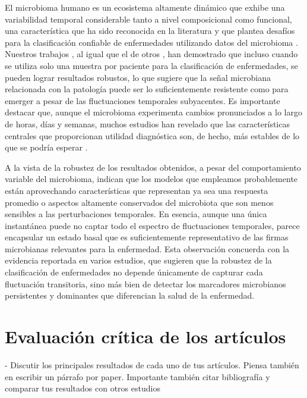 El microbioma humano es un ecosistema altamente dinámico que exhibe una variabilidad temporal considerable tanto a nivel composicional como funcional, una característica que ha sido reconocida en la literatura y que plantea desafíos para la clasificación confiable de enfermedades utilizando datos del microbioma \cite{aldars2021systematic}. Nuestros trabajos \cite{paper2, paper3}, al igual que el de otros \cite{eck2017robust}, han demostrado que incluso cuando se utiliza solo una muestra por paciente para la clasificación de enfermedades, se pueden lograr resultados robustos, lo que sugiere que la señal microbiana relacionada con la patología puede ser lo suficientemente resistente como para emerger a pesar de las fluctuaciones temporales subyacentes. Es importante destacar que, aunque el microbioma experimenta cambios pronunciados a lo largo de horas, días y semanas, muchos estudios han revelado que las características centrales que proporcionan utilidad diagnóstica son, de hecho, más estables de lo que se podría esperar \cite{mehta2018stability}.

A la vista de la robustez de los resultados obtenidos, a pesar del comportamiento variable del microbioma, indican que los modelos que empleamos probablemente están aprovechando características que representan ya sea una respuesta promedio o aspectos altamente conservados del microbiota que son menos sensibles a las perturbaciones temporales. En esencia, aunque una única instantánea puede no captar todo el espectro de fluctuaciones temporales, parece encapsular un estado basal que es suficientemente representativo de las firmas microbianas relevantes para la enfermedad. Esta observación concuerda con la evidencia reportada en varios estudios, que sugieren que la robustez de la clasificación de enfermedades no depende únicamente de capturar cada fluctuación transitoria, sino más bien de detectar los marcadores microbianos persistentes y dominantes que diferencian la salud de la enfermedad.





\section{Evaluación crítica de los artículos}

- Discutir los principales resultados de cada uno de tus artículos. Piensa también en escribir un párrafo por paper. Importante también citar bibliografía y comparar tus resultados con otros estudios


